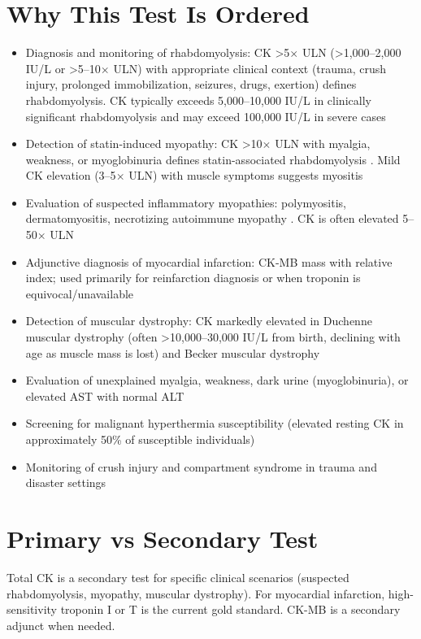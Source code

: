 \section*{Why This Test Is Ordered}
\begin{itemize}
  \item Diagnosis and monitoring of rhabdomyolysis: CK >5$\times$ ULN (>1,000--2,000 IU/L or >5--10$\times$ ULN) with appropriate clinical context (trauma, crush injury, prolonged immobilization, seizures, drugs, exertion) defines rhabdomyolysis. CK typically exceeds 5,000--10,000 IU/L in clinically significant rhabdomyolysis and may exceed 100,000 IU/L in severe cases \cite{bosch2009rhabdomyolysis}
  \item Detection of statin-induced myopathy: CK >10$\times$ ULN with myalgia, weakness, or myoglobinuria defines statin-associated rhabdomyolysis \cite{thompson2003statin}. Mild CK elevation (3--5$\times$ ULN) with muscle symptoms suggests myositis
  \item Evaluation of suspected inflammatory myopathies: polymyositis, dermatomyositis, necrotizing autoimmune myopathy \cite{dalakas2015inflammatory}. CK is often elevated 5--50$\times$ ULN
  \item Adjunctive diagnosis of myocardial infarction: CK-MB mass with relative index; used primarily for reinfarction diagnosis or when troponin is equivocal/unavailable
  \item Detection of muscular dystrophy: CK markedly elevated in Duchenne muscular dystrophy (often >10,000--30,000 IU/L from birth, declining with age as muscle mass is lost) and Becker muscular dystrophy
  \item Evaluation of unexplained myalgia, weakness, dark urine (myoglobinuria), or elevated AST with normal ALT
  \item Screening for malignant hyperthermia susceptibility (elevated resting CK in approximately 50\% of susceptible individuals)
  \item Monitoring of crush injury and compartment syndrome in trauma and disaster settings
\end{itemize}

\section*{Primary vs Secondary Test}
Total CK is a secondary test for specific clinical scenarios (suspected rhabdomyolysis, myopathy, muscular dystrophy). For myocardial infarction, high-sensitivity troponin I or T is the current gold standard. CK-MB is a secondary adjunct when needed.

